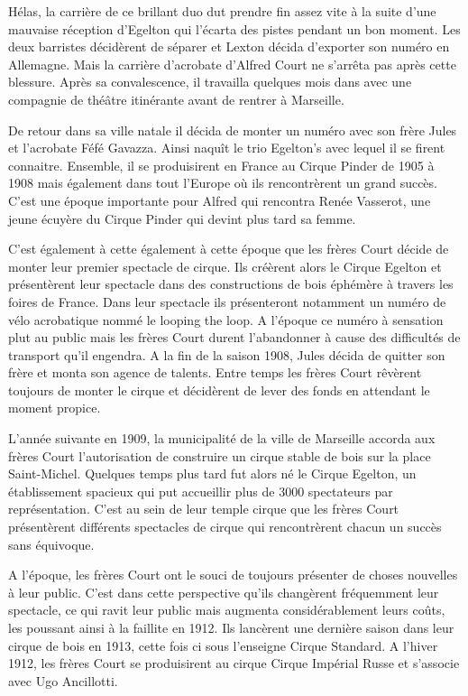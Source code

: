 Hélas, la carrière de ce brillant duo dut prendre fin assez vite à la suite d’une mauvaise réception d’Egelton qui l’écarta des pistes pendant un bon moment. Les deux barristes décidèrent de séparer et Lexton décida d’exporter son numéro en Allemagne. Mais la carrière d’acrobate d’Alfred Court ne s’arrêta pas après cette blessure. Après sa convalescence, il travailla quelques mois dans avec une compagnie de théâtre itinérante avant de rentrer à Marseille. 

De retour dans sa ville natale il décida de monter un numéro avec son frère Jules et l’acrobate Féfé Gavazza. Ainsi naquît le trio Egelton’s avec lequel il se firent connaitre. Ensemble, il se produisirent en France au Cirque Pinder de 1905 à 1908 mais également dans tout l’Europe où ils rencontrèrent un grand succès. C’est une époque importante pour Alfred qui rencontra Renée Vasserot, une jeune écuyère du Cirque Pinder qui devint plus tard sa femme.

C’est également à cette également à cette époque que les frères Court décide de monter leur premier spectacle de cirque. Ils créèrent alors le Cirque Egelton et présentèrent leur spectacle dans des constructions de bois éphémère à travers les foires de France. Dans leur spectacle ils présenteront notamment un numéro de vélo acrobatique nommé le looping the loop. A l’époque ce numéro à sensation plut au public mais les frères Court durent l’abandonner à cause des difficultés de transport qu’il engendra. A la fin de la saison 1908, Jules décida de quitter son frère et monta son agence de talents. Entre temps les frères Court rêvèrent toujours de monter le cirque et décidèrent de lever des fonds en attendant le moment propice. 

L’année suivante en 1909, la municipalité de la ville de Marseille accorda aux frères Court l’autorisation de construire un cirque stable de bois sur la place Saint-Michel. Quelques temps plus tard fut alors né le Cirque Egelton, un établissement spacieux qui put accueillir plus de 3000 spectateurs par représentation. C’est au sein de leur temple cirque que les frères Court présentèrent différents spectacles de cirque qui rencontrèrent chacun un succès sans équivoque.

A l’époque, les frères Court ont le souci de toujours présenter de choses nouvelles à leur public. C'est dans cette perspective qu'ils changèrent fréquemment leur spectacle, ce qui ravit leur public mais augmenta considérablement leurs coûts, les poussant ainsi à la faillite en 1912. Ils lancèrent une dernière saison dans leur cirque de bois en 1913, cette fois ci sous l’enseigne Cirque Standard. A l’hiver 1912, les frères Court se produisirent au cirque Cirque Impérial Russe et s’associe avec Ugo Ancillotti.

